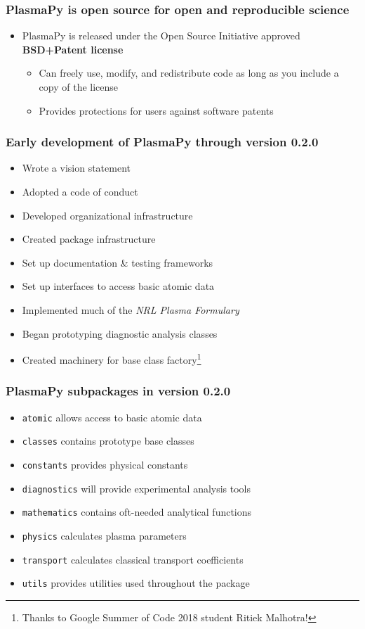 \documentclass[default,compress]{beamer}
\begin{document}
\begin{frame}[plain]
    \frametitle{PlasmaPy is open source for open and reproducible science}
    \begin{itemize}
    \item PlasmaPy is released under the Open Source Initiative approved \textbf{BSD+Patent license}
        \begin{itemize}
        \item Can freely use, modify, and redistribute code as long as you include a copy of the license
        \item Provides protections for users against software patents
        \end{itemize}
    \end{itemize}
\end{frame}


\begin{frame}[plain]
    \frametitle{Early development of PlasmaPy through version 0.2.0}
    \begin{itemize}
    \item Wrote a vision statement
    \item Adopted a code of conduct
    \item Developed organizational infrastructure 
    \item Created package infrastructure
    \item Set up documentation \& testing frameworks
    \item Set up interfaces to access basic atomic data
    \item Implemented much of the \emph{NRL Plasma Formulary}
    \item Began prototyping diagnostic analysis classes
    \item Created machinery for base class factory\footnote{Thanks to Google Summer of Code 2018 student Ritiek Malhotra!}
    \end{itemize}
\end{frame}


\begin{frame}[plain]
    \frametitle{PlasmaPy subpackages in version 0.2.0}
    \begin{itemize}
    \item \texttt{atomic} allows access to basic atomic data
    \item \texttt{classes} contains prototype base classes
    \item \texttt{constants} provides physical constants
    \item \texttt{diagnostics} will provide experimental analysis tools
    \item \texttt{mathematics} contains oft-needed analytical functions
    \item \texttt{physics} calculates plasma parameters
    \item \texttt{transport} calculates classical transport coefficients
    \item \texttt{utils} provides utilities used throughout the package
    \end{itemize}
\end{frame}
\end{document}
